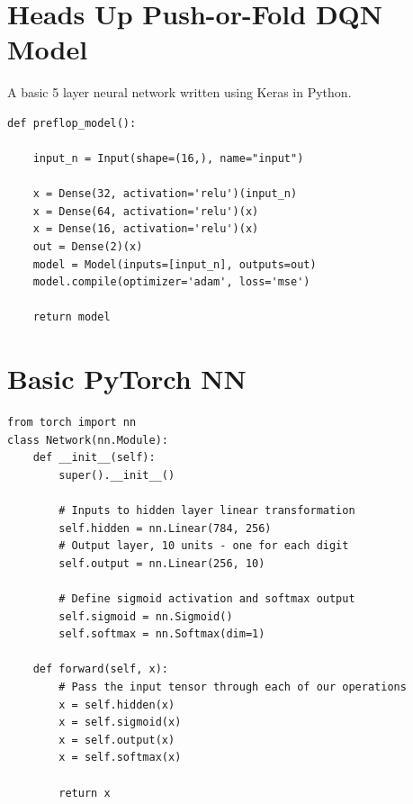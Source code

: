 \documentclass[12pt]{article}
\begin{document}
\section{Heads Up Push-or-Fold DQN Model}
\label{dqnmodel}
\normalsize
A basic 5 layer neural network written using Keras in Python.
\begin{verbatim}
def preflop_model():

    input_n = Input(shape=(16,), name="input")

    x = Dense(32, activation='relu')(input_n)
    x = Dense(64, activation='relu')(x)
    x = Dense(16, activation='relu')(x)
    out = Dense(2)(x)
    model = Model(inputs=[input_n], outputs=out)
    model.compile(optimizer='adam', loss='mse')

    return model
\end{verbatim}

\section{Basic PyTorch NN}
\begin{verbatim}
from torch import nn
class Network(nn.Module):
    def __init__(self):
        super().__init__()
        
        # Inputs to hidden layer linear transformation
        self.hidden = nn.Linear(784, 256)
        # Output layer, 10 units - one for each digit
        self.output = nn.Linear(256, 10)
        
        # Define sigmoid activation and softmax output 
        self.sigmoid = nn.Sigmoid()
        self.softmax = nn.Softmax(dim=1)
        
    def forward(self, x):
        # Pass the input tensor through each of our operations
        x = self.hidden(x)
        x = self.sigmoid(x)
        x = self.output(x)
        x = self.softmax(x)
        
        return x
\end{verbatim}
\end{document}
